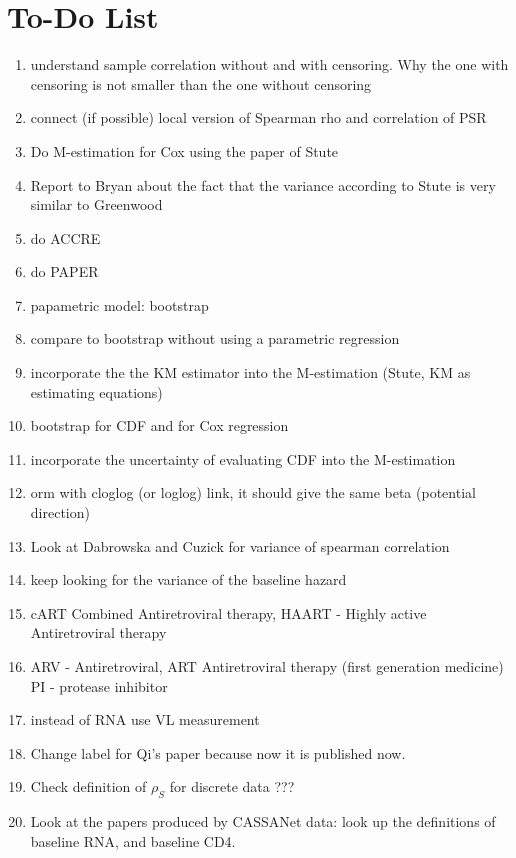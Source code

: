 \documentclass[]{article}
\begin{document}
\section{To-Do List}
\begin{enumerate}
  \item understand sample correlation without and with censoring. Why the one with censoring is not smaller than the one without censoring
  \item connect (if possible) local version of Spearman rho and correlation of PSR
  \item Do M-estimation for Cox using the paper of Stute
  \item Report to Bryan about the fact that the variance according to Stute is very similar to Greenwood
  \item do ACCRE
  \item do PAPER
  \item papametric model: bootstrap
  \item compare to bootstrap without using a parametric regression
  \item incorporate the the KM estimator into the M-estimation (Stute, KM as estimating equations)
  \item bootstrap for CDF and for Cox regression
  \item incorporate the uncertainty of evaluating CDF into the M-estimation
  \item orm with cloglog (or loglog) link, it should give the same beta (potential direction)
  \item Look at Dabrowska and Cuzick for variance of spearman correlation
  \item keep looking for the variance of the baseline hazard
  \item cART Combined Antiretroviral therapy, HAART - Highly active Antiretroviral therapy
  \item ARV - Antiretroviral, ART Antiretroviral therapy (first generation medicine) PI - protease inhibitor
  \item instead of RNA use VL measurement
  \item Change label for Qi's paper because now it is published now.
  \item Check definition of $\rho_S$ for discrete data ???
  \item Look at the papers produced by CASSANet data: look up the definitions of baseline RNA, and baseline CD4.

\end{enumerate}
\end{document}
